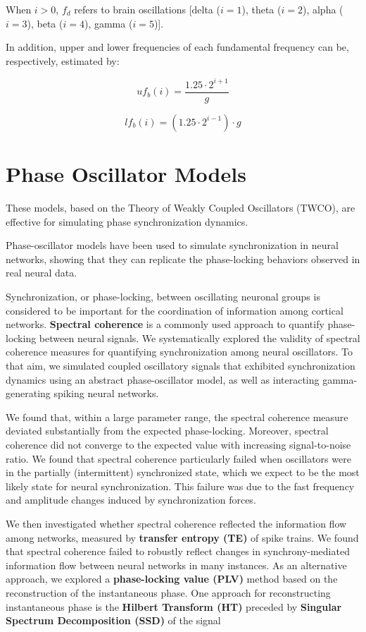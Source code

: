 \documentclass{article}
\begin{document}
When $i > 0$, $f_d$ refers to brain oscillations [delta ($i = 1$), theta ($i = 2$), alpha ($i = 3$), beta ($i = 4$), gamma ($i = 5$)].

In addition, upper and lower frequencies of each fundamental frequency can be, respectively, estimated by:

\[
uf_b(i) = \frac{1.25 \cdot 2^{i+1}}{g}
\]

\[
lf_b(i) = (1.25 \cdot 2^{i-1}) \cdot g
\]
\section{Phase Oscillator Models}

These models, based on the Theory of Weakly Coupled Oscillators (TWCO), are effective for simulating phase synchronization dynamics. 

Phase-oscillator models have been used to simulate synchronization in neural networks, showing that they can replicate the phase-locking behaviors observed in real neural data.

Synchronization, or phase-locking, between oscillating neuronal groups is considered to be important for the coordination of information among cortical networks. \textbf{Spectral coherence} is a commonly used approach to quantify phase-locking between neural signals. We systematically explored the validity of spectral coherence measures for quantifying synchronization among neural oscillators. To that aim, we simulated coupled oscillatory signals that exhibited synchronization dynamics using an abstract phase-oscillator model, as well as interacting gamma-generating spiking neural networks. 

We found that, within a large parameter range, the spectral coherence measure deviated substantially from the expected phase-locking. Moreover, spectral coherence did not converge to the expected value with increasing signal-to-noise ratio. We found that spectral coherence particularly failed when oscillators were in the partially (intermittent) synchronized state, which we expect to be the most likely state for neural synchronization. This failure was due to the fast frequency and amplitude changes induced by synchronization forces.

We then investigated whether spectral coherence reflected the information flow among networks, measured by \textbf{transfer entropy (TE)} of spike trains. We found that spectral coherence failed to robustly reflect changes in synchrony-mediated information flow between neural networks in many instances. As an alternative approach, we explored a \textbf{phase-locking value (PLV)} method based on the reconstruction of the instantaneous phase. One approach for reconstructing instantaneous phase is the \textbf{Hilbert Transform (HT)} preceded by \textbf{Singular Spectrum Decomposition (SSD)} of the signal
\end{document}
